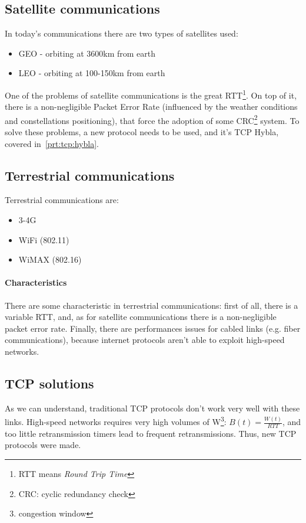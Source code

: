\subsection{Satellite communications}
In today's communications there are two types of satellites used:
\begin{itemize}
\item GEO - orbiting at 3600km from earth
\item LEO - orbiting at 100-150km from earth
\end{itemize}
One of the problems of satellite communications is the great RTT\footnote{RTT
  means \textit{Round Trip Time}}. On top of it, there is a non-negligible
Packet Error Rate (influenced by the weather conditions and constellations
positioning), that force the adoption of some CRC\footnote{CRC: cyclic
  redundancy check} system.
To solve these problems, a new protocol needs to be used, and it's TCP Hybla,
covered in~\ref{prt:tcp:hybla}.

\subsection{Terrestrial communications}
Terrestrial communications are:
\begin{itemize}
\item 3-4G
\item WiFi (802.11)
\item WiMAX (802.16)
\end{itemize}

\paragraph*{Characteristics} There are some characteristic in terrestrial
communications: first of all, there is a variable RTT, and, as for satellite
communications there is a non-negligible packet error rate. Finally, there are
performances issues for cabled links (e.g. fiber communications), because
internet protocols aren't able to exploit high-speed networks.

\subsection{TCP solutions}

As we can understand, traditional TCP protocols don't work very well with these
links. High-speed networks requires very high volumes of W\footnote{congestion
window}: $B(t) = \frac{W(t)}{RTT}$, and too little retransmission timers lead
to frequent retransmissions.
Thus, new TCP protocols were made.

